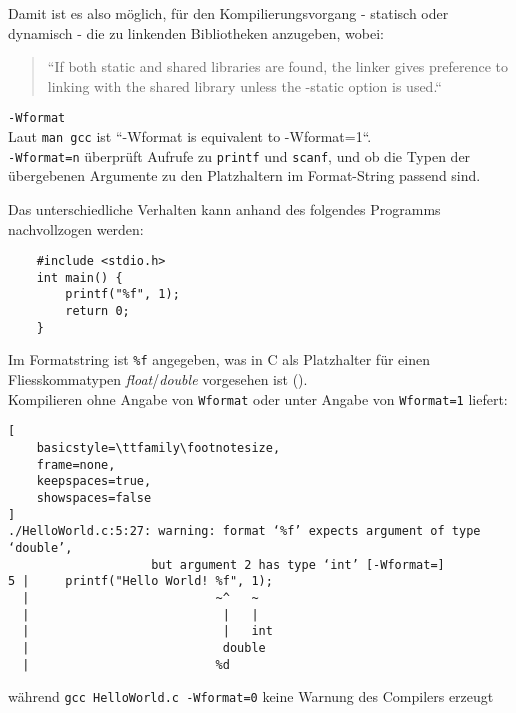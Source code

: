 \noindent
Damit ist es also möglich, für den Kompilierungsvorgang - statisch oder dynamisch - die zu linkenden Bibliotheken anzugeben, wobei:

\blockquote[]{
    ``If
    both static and shared libraries are found, the linker gives
    preference to linking with the shared library unless the
    -static option is used.``
}

\noindent
\texttt{-Wformat}\\

\noindent
Laut \texttt{man gcc} ist ``-Wformat is equivalent to -Wformat=1``.\\

\noindent
\texttt{-Wformat=n}  überprüft Aufrufe zu \texttt{printf} und \texttt{scanf}, und ob die Typen der übergebenen Argumente zu den Platzhaltern im Format-String passend sind.

\noindent
Das unterschiedliche Verhalten kann anhand des folgendes Programms nachvollzogen werden:

\begin{verbatim}
    #include <stdio.h>
    int main() {
        printf("%f", 1);
        return 0;
    }
\end{verbatim}

\noindent
Im Formatstring ist \texttt{\%f} angegeben, was in C als Platzhalter für einen Fliesskommatypen \textit{float}/\textit{double} vorgesehen ist (\cite[18, 244]{KR88}).\\

\noindent
Kompilieren ohne Angabe von \texttt{Wformat} oder unter Angabe von \texttt{Wformat=1} liefert:\\

\begin{lstlisting}[
    basicstyle=\ttfamily\footnotesize,
    frame=none,
    keepspaces=true,
    showspaces=false
]
./HelloWorld.c:5:27: warning: format ‘%f’ expects argument of type ‘double’,
                    but argument 2 has type ‘int’ [-Wformat=]
5 |     printf("Hello World! %f", 1);
  |                          ~^   ~
  |                           |   |
  |                           |   int
  |                           double
  |                          %d
\end{lstlisting}

\noindent
während \texttt{gcc HelloWorld.c -Wformat=0} keine Warnung des Compilers erzeugt